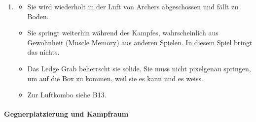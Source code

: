 \documentclass[../Main.tex]{subfiles}
\begin{document}
\begin{enumerate}[label=\textbf{B\arabic*}, leftmargin=1.5cm, itemsep=0.8em]
\item
\begin{itemize}[nosep]
    \item Sie wird wiederholt in der Luft von Archers abgeschossen und fällt zu Boden.
    \item Sie springt weiterhin während des Kampfes, wahrscheinlich aus Gewohnheit (Muscle Memory) aus anderen Spielen. In diesem Spiel bringt das nichts.
    \item Das Ledge Grab beherrscht sie solide. Sie muss nicht pixelgenau springen, um auf die Box zu kommen, weil sie es kann und es weiss.
    \item Zur Luftkombo siehe B13.
\end{itemize}
\end{enumerate}

\paragraph{Gegnerplatzierung und Kampfraum}
\end{document}
